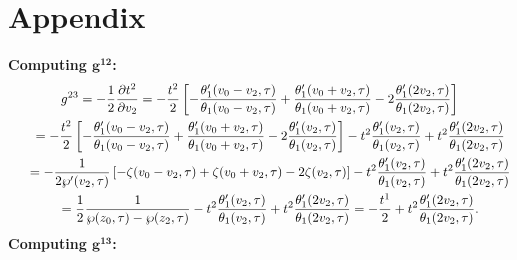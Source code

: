 \documentclass[10pt,a4paper]{amsart}
\numberwithin{equation}{section}
\begin{document}
\section{Appendix}\label{appendixA}
\textbf{Computing $\boldsymbol {g^{12}}$:}
\begin{gather*}
g^{23}=-\frac{1}{2}\frac{\partial t^{2}}{\partial v_2}=-\frac{t^2}{2}\left[-\frac{\theta_1^{\prime}(v_0-v_2,\tau)}{\theta_1(v_0-v_2,\tau)} +\frac{\theta_1^{\prime}(v_0+v_2,\tau)}{\theta_1(v_0+v_2,\tau)} -2\frac{\theta_1^{\prime}(2v_2,\tau)}{\theta_1(2v_2,\tau)}\right]
\\ \hphantom{g^{23}}
{}=-\frac{t^2}{2}\left[-\frac{\theta_1^{\prime}(v_0-v_2,\tau)}{\theta_1(v_0-v_2,\tau)} +\frac{\theta_1^{\prime}(v_0+v_2,\tau)}{\theta_1(v_0+v_2,\tau)} -2\frac{\theta_1^{\prime}(v_2,\tau)}{\theta_1(v_2,\tau)}\right] -t^2\frac{\theta_1^{\prime}(v_2,\tau)}{\theta_1(v_2,\tau)}
+t^2\frac{\theta_1^{\prime}(2v_2,\tau)}{\theta_1(2v_2,\tau)}
\\ \hphantom{g^{23}}
{}=-\frac{1}{2\wp^{\prime}(v_2,\tau)}\left[-\zeta(v_0-v_2,\tau)+\zeta(v_0+v_2,\tau) -2\zeta(v_2,\tau)\right]-t^2\frac{\theta_1^{\prime}(v_2,\tau)}{\theta_1(v_2,\tau)}
+t^2\frac{\theta_1^{\prime}(2v_2,\tau)}{\theta_1(2v_2,\tau)}
\\ \hphantom{g^{23}}
{}=\frac{1}{2}\frac{1}{\wp(z_0,\tau)-\wp(z_2,\tau)} -t^2\frac{\theta_1^{\prime}(v_2,\tau)}{\theta_1(v_2,\tau)} +t^2\frac{\theta_1^{\prime}(2v_2,\tau)}{\theta_1(2v_2,\tau)}
=-\frac{t^1}{2}+t^2\frac{\theta_1^{\prime}(2v_2,\tau)}{\theta_1(2v_2,\tau)}.
\end{gather*}
\textbf{Computing $\boldsymbol {g^{13}}$:}
\end{document}
